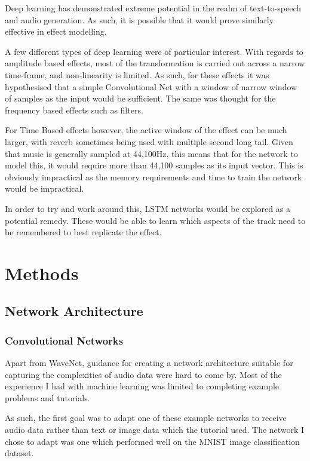 \documentclass{l4proj}
\begin{document}
Deep learning has demonstrated extreme potential in the realm of
text-to-speech and audio generation. As such, it is possible that it
would prove similarly effective in effect modelling.

A few different types of deep learning were of particular interest. With
regards to amplitude based effects, most of the transformation is
carried out across a narrow time-frame, and non-linearity is limited. As
such, for these effects it was hypothesised that a simple Convolutional
Net with a window of narrow window of samples as the input would be
sufficient. The same was thought for the frequency based effects such as
filters.

For Time Based effects however, the active window of the effect can be
much larger, with reverb sometimes being used with multiple second long
tail. Given that music is generally sampled at 44,100Hz, this means that
for the network to model this, it would require more than 44,100 samples
as its input vector. This is obviously impractical as the memory
requirements and time to train the network would be impractical.

In order to try and work around this, LSTM networks would be explored as
a potential remedy. These would be able to learn which aspects of the
track need to be remembered to best replicate the effect.

\chapter{Methods}\label{methods}

\section{Network Architecture}\label{network-architecture}

\subsection{Convolutional Networks}\label{convolutional-networks}

Apart from WaveNet, guidance for creating a network architecture
suitable for capturing the complexities of audio data were hard to come
by. Most of the experience I had with machine learning was limited to
completing example problems and tutorials.

As such, the first goal was to adapt one of these example networks to
receive audio data rather than text or image data which the tutorial
used. The network I chose to adapt was one which performed well on the
MNIST image classification dataset.
\end{document}

